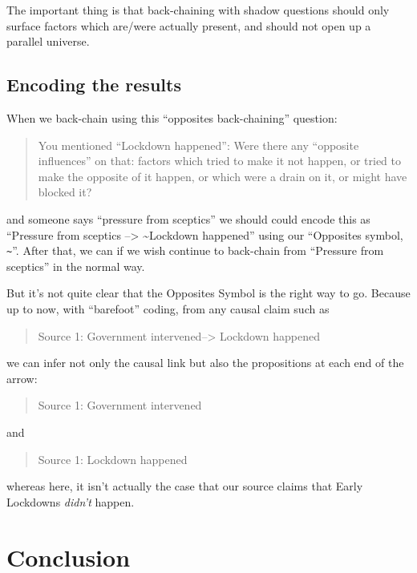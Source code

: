 \documentclass[
]{book}
\begin{document}
The important thing is that back-chaining with shadow questions should only surface factors which are/were actually present, and should not open up a parallel universe.

\hypertarget{encoding-the-results}{%
\subsection{Encoding the results}\label{encoding-the-results}}

When we back-chain using this ``opposites back-chaining'' question:

\begin{quote}
You mentioned ``Lockdown happened'': Were there any ``opposite influences'' on that: factors which tried to make it not happen, or tried to make the opposite of it happen, or which were a drain on it, or might have blocked it?
\end{quote}

and someone says ``pressure from sceptics'' we should could encode this as ``Pressure from sceptics --\textgreater{} \textasciitilde Lockdown happened'' using our ``Opposites symbol, \texttt{\textasciitilde{}}''. After that, we can if we wish continue to back-chain from ``Pressure from sceptics'' in the normal way.

But it's not quite clear that the Opposites Symbol is the right way to go. Because up to now, with ``barefoot'' coding, from any causal claim such as

\begin{quote}
Source 1: Government intervened--\textgreater{} Lockdown happened
\end{quote}

we can infer not only the causal link but also the propositions at each end of the arrow:

\begin{quote}
Source 1: Government intervened
\end{quote}

and

\begin{quote}
Source 1: Lockdown happened
\end{quote}

whereas here, it isn't actually the case that our source claims that Early Lockdowns \emph{didn't} happen.

\hypertarget{conclusion}{%
\section{Conclusion}\label{conclusion}}
\end{document}
